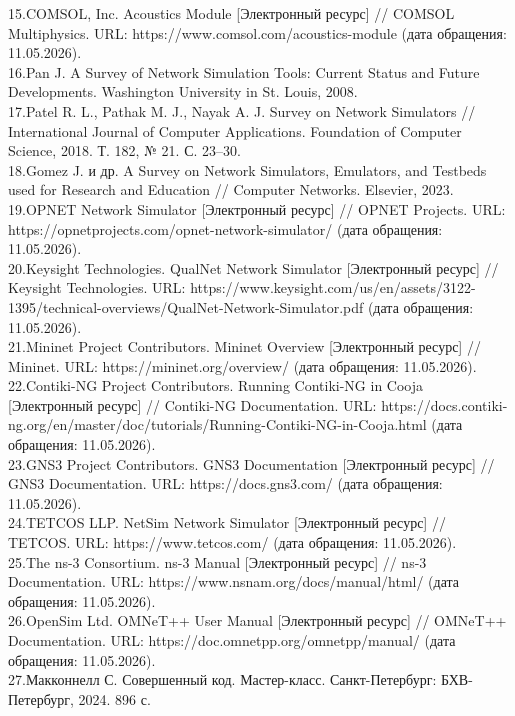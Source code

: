 {15.COMSOL, Inc. Acoustics Module {[}Электронный ресурс{]} // COMSOL
Multiphysics. URL: https://www.comsol.com/acoustics-module (дата
обращения: 11.05.2026).\\
16.Pan J. A Survey of Network Simulation Tools: Current Status and
Future Developments. Washington University in St. Louis, 2008.\\
17.Patel R. L., Pathak M. J., Nayak A. J. Survey on Network Simulators
// International Journal of Computer Applications. Foundation of
Computer Science, 2018. Т. 182, № 21. С. 23--30.\\
18.Gomez J. и др. A Survey on Network Simulators, Emulators, and
Testbeds used for Research and Education // Computer Networks. Elsevier,
2023.\\
19.OPNET Network Simulator {[}Электронный ресурс{]} // OPNET Projects.
URL: https://opnetprojects.com/opnet-network-simulator/ (дата обращения:
11.05.2026).\\
20.Keysight Technologies. QualNet Network Simulator {[}Электронный
ресурс{]} // Keysight Technologies. URL:
https://www.keysight.com/us/en/assets/3122-1395/technical-overviews/QualNet-Network-Simulator.pdf
(дата обращения: 11.05.2026).\\
21.Mininet Project Contributors. Mininet Overview {[}Электронный
ресурс{]} // Mininet. URL: https://mininet.org/overview/ (дата
обращения: 11.05.2026).\\
22.Contiki-NG Project Contributors. Running Contiki-NG in Cooja
{[}Электронный ресурс{]} // Contiki-NG Documentation. URL:
https://docs.contiki-ng.org/en/master/doc/tutorials/Running-Contiki-NG-in-Cooja.html
(дата обращения: 11.05.2026).\\
23.GNS3 Project Contributors. GNS3 Documentation {[}Электронный
ресурс{]} // GNS3 Documentation. URL: https://docs.gns3.com/ (дата
обращения: 11.05.2026).\\
24.TETCOS LLP. NetSim Network Simulator {[}Электронный ресурс{]} //
TETCOS. URL: https://www.tetcos.com/ (дата обращения: 11.05.2026).\\
25.The ns-3 Consortium. ns-3 Manual {[}Электронный ресурс{]} // ns-3
Documentation. URL: https://www.nsnam.org/docs/manual/html/ (дата
обращения: 11.05.2026).\\
26.OpenSim Ltd. OMNeT++ User Manual {[}Электронный ресурс{]} // OMNeT++
Documentation. URL: https://doc.omnetpp.org/omnetpp/manual/ (дата
обращения: 11.05.2026).\\
27.Макконнелл С. Совершенный код. Мастер-класс. Санкт-Петербург:
БХВ-Петербург, 2024. 896 с.\\
}
